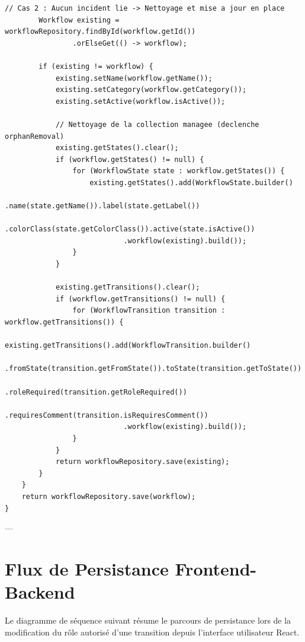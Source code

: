 \documentclass[11pt,a4paper]{article}
\begin{document}
\begin{lstlisting}[language=CustomJava, caption={Algorithme de sauvegarde securise dans WorkflowService.java}]
        // Cas 2 : Aucun incident lie -> Nettoyage et mise a jour en place
        Workflow existing = workflowRepository.findById(workflow.getId())
                .orElseGet(() -> workflow);

        if (existing != workflow) {
            existing.setName(workflow.getName());
            existing.setCategory(workflow.getCategory());
            existing.setActive(workflow.isActive());

            // Nettoyage de la collection managee (declenche orphanRemoval)
            existing.getStates().clear();
            if (workflow.getStates() != null) {
                for (WorkflowState state : workflow.getStates()) {
                    existing.getStates().add(WorkflowState.builder()
                            .name(state.getName()).label(state.getLabel())
                            .colorClass(state.getColorClass()).active(state.isActive())
                            .workflow(existing).build());
                }
            }

            existing.getTransitions().clear();
            if (workflow.getTransitions() != null) {
                for (WorkflowTransition transition : workflow.getTransitions()) {
                    existing.getTransitions().add(WorkflowTransition.builder()
                            .fromState(transition.getFromState()).toState(transition.getToState())
                            .roleRequired(transition.getRoleRequired())
                            .requiresComment(transition.isRequiresComment())
                            .workflow(existing).build());
                }
            }
            return workflowRepository.save(existing);
        }
    }
    return workflowRepository.save(workflow);
}
\end{lstlisting}

---

\section{Flux de Persistance Frontend-Backend}

Le diagramme de séquence suivant résume le parcours de persistance lors de la modification du rôle autorisé d'une transition depuis l'interface utilisateur React.
\end{document}
